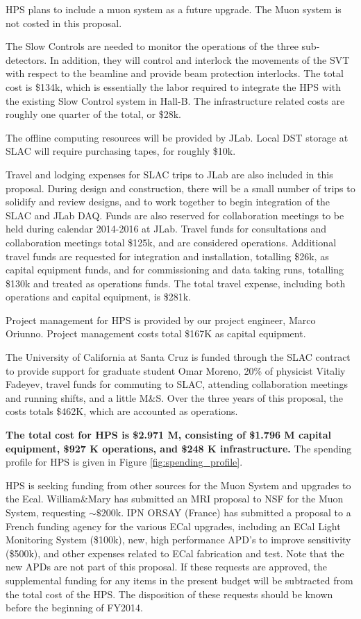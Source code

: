 HPS plans to include a muon system as a future upgrade. The Muon system is not costed in this proposal.

The Slow Controls are needed to monitor the operations of the three sub-detectors. In addition, they will control and interlock the 
movements of the SVT with respect to the beamline and provide beam protection interlocks. The total cost is \$134k, which is essentially 
the labor required to integrate the HPS with the existing Slow Control system in Hall-B. The infrastructure related costs are roughly
one quarter of the total, or \$28k.

The offline computing resources will be provided by JLab. Local DST storage at SLAC will require purchasing tapes, for roughly \$10k. 

Travel and lodging expenses for SLAC trips to JLab are also included in this proposal. During design and construction, 
there will be a small number of trips to solidify and review designs, and to work together to begin integration of the SLAC 
and JLab DAQ. Funds are also reserved for collaboration meetings to be held during calendar 2014-2016 at JLab. Travel funds for
consultations and collaboration meetings total \$125k, and are considered operations. Additional travel funds are requested for integration 
and installation, totalling \$26k, as capital equipment funds, and for commissioning and data taking runs, totalling \$130k and treated as operations 
funds. The total travel expense, including both operations and capital equipment, is \$281k.

Project management for HPS is provided by our project engineer, Marco Oriunno. Project management costs total \$167K as capital equipment.

The University of California at Santa Cruz is funded through the SLAC contract to provide support for graduate student Omar Moreno, 20\% of physicist
Vitaliy Fadeyev, travel funds for commuting to SLAC, attending collaboration meetings and running shifts, and a little M\&S. Over the three
years of this proposal, the costs totals \$462K, which are accounted as operations.


{\bf The total cost for HPS is \$2.971 M, consisting of \$1.796 M capital equipment, \$927 K operations, and \$248 K infrastructure. }
The spending profile for HPS is given in Figure \ref{fig:spending_profile}.

HPS is seeking funding from other sources for the Muon System and upgrades to the Ecal.
William\&Mary has submitted an MRI proposal to NSF for the Muon System, requesting $\sim \$200$k. IPN ORSAY (France) 
has submitted a proposal to a French funding agency for the various ECal upgrades, including an ECal Light Monitoring System (\$100k), new, 
high performance  APD's to improve sensitivity (\$500k), and other expenses related to ECal fabrication and test.
Note that the new APDs are not part of this proposal. If these requests are approved, the supplemental funding for any items in the present 
budget will be subtracted from the total cost of the HPS. The disposition of these requests should be known before the beginning of FY2014.

